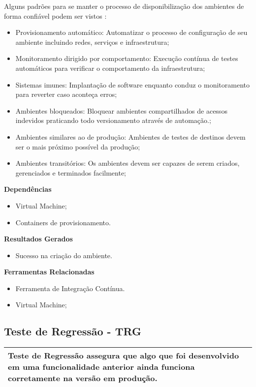 Alguns padrões para se manter o processo de disponibilização dos ambientes de forma confiável podem ser vistos \cite{duvall2011}:

\begin{itemize}
    \item Provisionamento automático: Automatizar o processo de configuração de seu ambiente incluindo redes, serviços e infraestrutura;
    \item Monitoramento dirigido por comportamento: Execução contínua de testes automáticos para verificar o comportamento da infraestrutura;
    \item Sistemas imunes: Implantação de software enquanto conduz o monitoramento para reverter caso aconteça erros;
    \item Ambientes bloqueados: Bloquear ambientes compartilhados de acessos indevidos praticando todo versionamento através de automação.;
    \item Ambientes similares ao de produção: Ambientes de testes de destinos devem ser o mais próximo possível da produção;
    \item Ambientes transitórios: Os ambientes devem ser capazes de serem criados, gerenciados e terminados facilmente;
\end{itemize}

\textbf{Dependências}
\begin{itemize}
    \item Virtual Machine;
    \item Containers de provisionamento.
\end{itemize}

\textbf{ Resultados Gerados}
\begin{itemize}
    \item Sucesso na criação do ambiente.
\end{itemize}

\textbf{Ferramentas Relacionadas}
\begin{itemize}
    \item Ferramenta de Integração Contínua.
    \item Virtual Machine;
\end{itemize}

\subsection{Teste de Regressão - TRG}
\label{sec:trg}

\begin{table}[!ht]
\centering
\begin{tabular}{|p{130mm}|}
\hline
 Teste de Regressão assegura que algo que foi desenvolvido em uma funcionalidade anterior ainda funciona corretamente na versão em produção. \\
\hline
\end{tabular}
\end{table}

